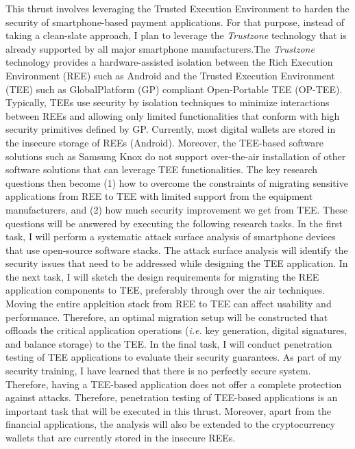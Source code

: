 \documentclass{NSF}
\newcommand{\ie}{{\em i.e.}\xspace}
\begin{document}
This thrust involves leveraging the Trusted Execution Environment to harden the security of smartphone-based payment applications. For that purpose, instead of taking a clean-slate approach, I plan to leverage the {\em Trustzone} technology that is already supported by all major smartphone manufacturers.The {\em Trustzone} technology provides a hardware-assisted isolation between the Rich Execution Environment (REE) such as Android and the Trusted Execution Environment (TEE) such as GlobalPlatform (GP) compliant Open-Portable TEE (OP-TEE). Typically, TEEs use security by isolation techniques to minimize interactions between REEs and allowing only limited functionalities that conform with high security primitives defined by GP. Currently, most digital wallets are stored in the insecure storage of REEs (Android). Moreover, the TEE-based software solutions such as Samsung Knox do not support over-the-air installation of other software solutions that can leverage TEE functionalities. The key research questions then become (1) how to overcome the constraints of migrating sensitive applications from REE to TEE with limited support from the equipment manufacturers, and (2) how much security improvement we get from TEE. These questions will be answered by executing the following research tasks. In the first task, I will perform a systematic attack surface analysis of smartphone devices that use open-source software stacks. The attack surface analysis will identify the security issues that need to be addressed while designing the TEE application. In the next task, I will sketch the design requirements for migrating the REE application components to TEE, preferably through over the air techniques. Moving the entire applcition stack from REE to TEE can affect usability and performance. Therefore, an optimal migration setup will be constructed that offloads the critical application operations (\ie key generation, digital signatures, and balance storage) to the TEE. In the final task, I will conduct penetration testing of TEE applications to evaluate their security guarantees. As part of my security training, I have learned that there is no perfectly secure system. Therefore, having a TEE-based application does not offer a complete protection against attacks. Therefore, penetration testing of TEE-based applications is an important task that will be executed in this thrust. Moreover, apart from the financial applications, the analysis will also be extended to the cryptocurrency wallets that are currently stored in the insecure REEs. 
\end{document}
